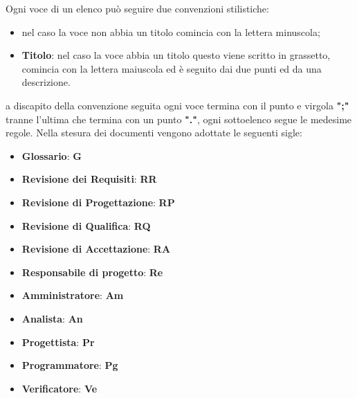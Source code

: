 	    Ogni voce di un elenco può seguire due convenzioni stilistiche:
	    \begin{itemize}
	        \item nel caso la voce non abbia un titolo comincia con la lettera minuscola;
	        \item \textbf{Titolo}: nel caso la voce abbia un titolo questo viene scritto in grassetto, comincia con la lettera maiuscola ed è seguito dai due punti ed da una descrizione.
	    \end{itemize}
	    a discapito della convenzione seguita ogni voce termina con il punto e virgola \textbf{";"} tranne l'ultima che termina con un punto \textbf{"."}, ogni sottoelenco segue le medesime regole.
	    Nella stesura dei documenti vengono adottate le seguenti sigle:
	    \begin{itemize}
	        \item \textbf{Glossario}: \textbf{G}
	        \item \textbf{Revisione dei Requisiti}: \textbf{RR}
	        \item \textbf{Revisione di Progettazione}: \textbf{RP}
	        \item \textbf{Revisione di Qualifica}: \textbf{RQ}
	        \item \textbf{Revisione di Accettazione}: \textbf{RA}
	        \item \textbf{Responsabile di progetto}: \textbf{Re}
	        \item \textbf{Amministratore}: \textbf{Am}
	        \item \textbf{Analista}: \textbf{An}
	        \item \textbf{Progettista}: \textbf{Pr}
	        \item \textbf{Programmatore}: \textbf{Pg}
	        \item \textbf{Verificatore}: \textbf{Ve}
	    \end{itemize}
